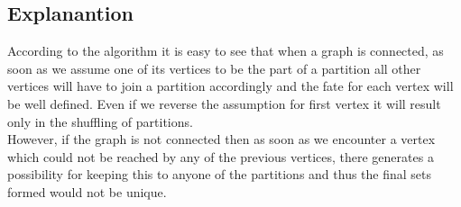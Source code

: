 \documentclass[20pt]{article}
\begin{document}
\subsection{Explanantion}
According to the algorithm it is easy to see that when a graph is connected, as soon as we assume one of its vertices to be the part of a partition all other vertices will have to join a partition accordingly and the fate for each vertex will be well defined. Even if we reverse the assumption for first vertex it will result only in the shuffling of partitions. \\
However, if the graph is not connected then as soon as we encounter a vertex which could not be reached by any of the previous vertices, there generates a possibility for keeping this to anyone of the partitions and thus the final sets formed would not be unique.
\end{document}
